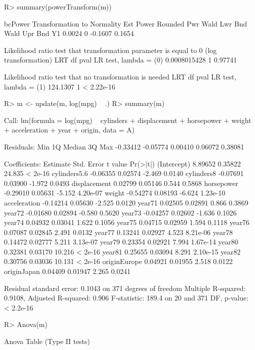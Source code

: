 \documentclass[
]{jss}
\begin{document}
\begin{CodeChunk}
\begin{CodeInput}
R> summary(powerTransform(m))
\end{CodeInput}
\begin{CodeOutput}
bcPower Transformation to Normality 
   Est Power Rounded Pwr Wald Lwr Bnd Wald Upr Bnd
Y1    0.0024           0      -0.1607       0.1654

Likelihood ratio test that transformation parameter is equal to 0
 (log transformation)
                               LRT df    pval
LR test, lambda = (0) 0.0008015428  1 0.97741

Likelihood ratio test that no transformation is needed
                           LRT df       pval
LR test, lambda = (1) 124.1307  1 < 2.22e-16
\end{CodeOutput}
\begin{CodeInput}
R> m <- update(m, log(mpg) ~ .)
R> summary(m)
\end{CodeInput}
\begin{CodeOutput}

Call:
lm(formula = log(mpg) ~ cylinders + displacement + horsepower + 
    weight + acceleration + year + origin, data = A)

Residuals:
     Min       1Q   Median       3Q      Max 
-0.33412 -0.05774  0.00410  0.06072  0.38081 

Coefficients:
             Estimate Std. Error t value Pr(>|t|)
(Intercept)   8.89652    0.35822  24.835  < 2e-16
cylinders5.6 -0.06355    0.02574  -2.469   0.0140
cylinders8   -0.07691    0.03900  -1.972   0.0493
displacement  0.02799    0.05146   0.544   0.5868
horsepower   -0.29010    0.05631  -5.152 4.20e-07
weight       -0.54274    0.08193  -6.624 1.23e-10
acceleration -0.14214    0.05630  -2.525   0.0120
year71        0.02505    0.02891   0.866   0.3869
year72       -0.01680    0.02894  -0.580   0.5620
year73       -0.04257    0.02602  -1.636   0.1026
year74        0.04932    0.03041   1.622   0.1056
year75        0.04715    0.02959   1.594   0.1118
year76        0.07087    0.02845   2.491   0.0132
year77        0.13241    0.02927   4.523 8.21e-06
year78        0.14472    0.02777   5.211 3.13e-07
year79        0.23354    0.02921   7.994 1.67e-14
year80        0.32381    0.03170  10.216  < 2e-16
year81        0.25655    0.03094   8.291 2.10e-15
year82        0.30756    0.03036  10.131  < 2e-16
originEurope  0.04921    0.01955   2.518   0.0122
originJapan   0.04409    0.01947   2.265   0.0241

Residual standard error: 0.1043 on 371 degrees of freedom
Multiple R-squared:  0.9108,    Adjusted R-squared:  0.906 
F-statistic: 189.4 on 20 and 371 DF,  p-value: < 2.2e-16
\end{CodeOutput}
\begin{CodeInput}
R> Anova(m)
\end{CodeInput}
\begin{CodeOutput}
Anova Table (Type II tests)


\end{CodeOutput}
\end{CodeChunk}
\end{document}
